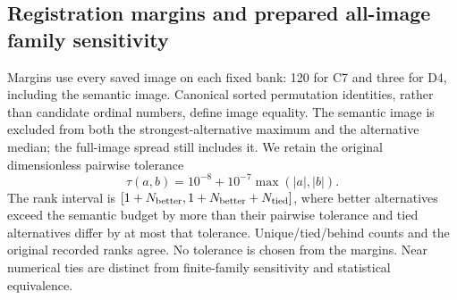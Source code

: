 \begin{table}[p]
\centering\small\setlength{\tabcolsep}{3pt}

\caption{C7 same-bank references and premium endpoints, all \BoundedCellsPerDomain{} fixed cells. $L(I)$ is the identity-action risk, not the loss for the identity group element alone.}
\label{tab:bounded-cell-risk-c7}
\end{table}
\begin{table}[p]
\centering\small\setlength{\tabcolsep}{3pt}

\caption{D4 same-bank references and premium endpoints, all \BoundedCellsPerDomain{} fixed cells. No family or model resampling enters these quantities.}
\label{tab:bounded-cell-risk-d4}
\end{table}
\begin{table}[p]
\centering\small\setlength{\tabcolsep}{3pt}

\caption{C7 total/selected type-energy pairs $e_\tau/b_\tau$. Complete real rotation planes are retained in the budget; total energy and selected energy are distinct.}
\label{tab:bounded-cell-types-c7}
\end{table}
\begin{table}[p]
\centering\small\setlength{\tabcolsep}{3pt}

\caption{D4 total/selected type-energy pairs $e_\tau/b_\tau$. The corner action has only four states; absent types retain their recorded machine-scale values in the CSV, rounded here for display.}
\label{tab:bounded-cell-types-d4}
\end{table}

\FloatBarrier
\subsection{Registration margins and prepared all-image family sensitivity}
\label{app:bounded-margin-details}
Margins use every saved image on each fixed bank: 120 for C7 and three for D4, including the semantic image. Canonical sorted permutation identities, rather than candidate ordinal numbers, define image equality. The semantic image is excluded from both the strongest-alternative maximum and the alternative median; the full-image spread still includes it. We retain the original dimensionless pairwise tolerance
\[
 \tau(a,b)=10^{-8}+10^{-7}\max(|a|,|b|).
\]
The rank interval is $[1+N_{\rm better},1+N_{\rm better}+N_{\rm tied}]$, where better alternatives exceed the semantic budget by more than their pairwise tolerance and tied alternatives differ by at most that tolerance. Unique/tied/behind counts and the original recorded ranks agree. No tolerance is chosen from the margins. Near numerical ties are distinct from finite-family sensitivity and statistical equivalence.

